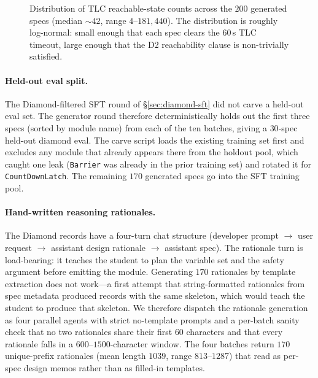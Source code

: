 \documentclass[11pt]{article}
\begin{document}
\begin{figure}[t]
\centering
{}
\caption{Distribution of TLC reachable-state counts across the $200$
generated specs (median $\sim\!42$, range $4$--$181{,}440$). The
distribution is roughly log-normal: small enough that each spec clears
the $60$\,s TLC timeout, large enough that the D2 reachability clause
is non-trivially satisfied.}
\label{fig:state-space}
\end{figure}

\paragraph{Held-out eval split.} The Diamond-filtered SFT round of
\S\ref{sec:diamond-sft} did not carve a held-out eval set. The
generator round therefore deterministically holds out the first three
specs (sorted by module name) from each of the ten batches, giving a
$30$-spec held-out diamond eval. The carve script loads the existing
training set first and excludes any module that already appears there
from the holdout pool, which caught one leak (\texttt{Barrier} was
already in the prior training set) and rotated it for
\texttt{CountDownLatch}. The remaining $170$ generated specs go into the
SFT training pool.

\paragraph{Hand-written reasoning rationales.} The Diamond records have
a four-turn chat structure (developer prompt $\to$ user request $\to$
assistant design rationale $\to$ assistant spec). The rationale turn is
load-bearing: it teaches the student to plan the variable set and the
safety argument before emitting the module. Generating $170$ rationales
by template extraction does not work---a first attempt that
string-formatted rationales from spec metadata produced records with the
same skeleton, which would teach the student to produce that skeleton.
We therefore dispatch the rationale generation as four parallel agents
with strict no-template prompts and a per-batch sanity check that no two
rationales share their first $60$ characters and that every rationale
falls in a $600$--$1500$-character window. The four batches return
$170$ unique-prefix rationales (mean length $1039$, range $813$--$1287$)
that read as per-spec design memos rather than as filled-in templates.
\end{document}
